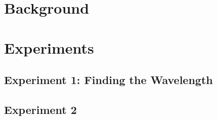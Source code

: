 \documentclass[twocolumn]{article}
\begin{document}
  

\graphicspath{{./images/}}



\onecolumn
\tableofcontents

\clearpage

\twocolumn
\section{Background}






		

		
\section{Experiments}
	\subsection{Experiment 1: Finding the Wavelength}
		
	\subsection{Experiment 2}
	
\clearpage	
	
\appendix



\clearpage





 
\end{document}
